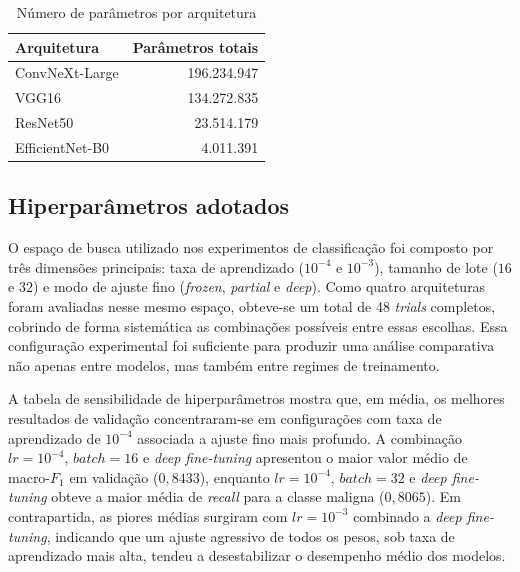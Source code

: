 \documentclass[tcc,capa]{texufpel}
\begin{document}
\begin{table}[htbp]
	\centering
	\caption{Número de parâmetros por arquitetura}
	\label{tab:parametros_modelos}
	\begin{tabular}{|l|r|}
		\hline
		\textbf{Arquitetura} & \textbf{Parâmetros totais} \\ \hline
		ConvNeXt-Large & 196.234.947 \\ \hline
		VGG16 & 134.272.835 \\ \hline
		ResNet50 & 23.514.179 \\ \hline
		EfficientNet-B0 & 4.011.391 \\ \hline
	\end{tabular}
\end{table}

\subsection{Hiperparâmetros adotados}

O espaço de busca utilizado nos experimentos de classificação foi composto por três dimensões principais: taxa de aprendizado (\(10^{-4}\) e \(10^{-3}\)), tamanho de lote (\(16\) e \(32\)) e modo de ajuste fino (\textit{frozen}, \textit{partial} e \textit{deep}). Como quatro arquiteturas foram avaliadas nesse mesmo espaço, obteve-se um total de 48 \textit{trials} completos, cobrindo de forma sistemática as combinações possíveis entre essas escolhas. Essa configuração experimental foi suficiente para produzir uma análise comparativa não apenas entre modelos, mas também entre regimes de treinamento.

A tabela de sensibilidade de hiperparâmetros mostra que, em média, os melhores resultados de validação concentraram-se em configurações com taxa de aprendizado de \(10^{-4}\) associada a ajuste fino mais profundo. A combinação \(lr = 10^{-4}\), \(batch = 16\) e \textit{deep fine-tuning} apresentou o maior valor médio de macro-\(F_1\) em validação (\(0{,}8433\)), enquanto \(lr = 10^{-4}\), \(batch = 32\) e \textit{deep fine-tuning} obteve a maior média de \textit{recall} para a classe maligna (\(0{,}8065\)). Em contrapartida, as piores médias surgiram com \(lr = 10^{-3}\) combinado a \textit{deep fine-tuning}, indicando que um ajuste agressivo de todos os pesos, sob taxa de aprendizado mais alta, tendeu a desestabilizar o desempenho médio dos modelos.
\end{document}
